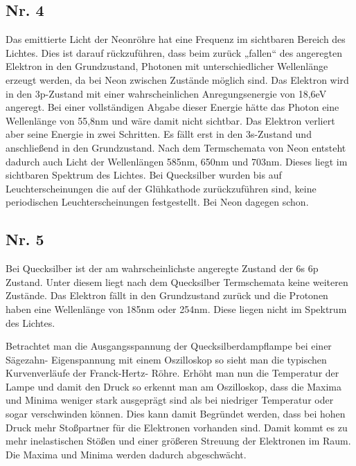 \subsection{Nr. 4}
Das emittierte Licht der Neonröhre hat eine Frequenz im sichtbaren Bereich des Lichtes. Dies ist
darauf rückzuführen, dass beim zurück „fallen“ des angeregten Elektron in den Grundzustand,
Photonen mit unterschiedlicher Wellenlänge erzeugt werden, da bei Neon zwischen Zustände
möglich sind. Das Elektron wird in den 3p-Zustand mit einer wahrscheinlichen Anregungsenergie von
18,6eV angeregt. Bei einer vollständigen Abgabe dieser Energie hätte das Photon eine Wellenlänge
von 55,8nm und wäre damit nicht sichtbar. Das Elektron verliert aber seine Energie in zwei Schritten.
Es fällt erst in den 3s-Zustand und anschließend in den Grundzustand. Nach dem Termschemata von
Neon entsteht dadurch auch Licht der Wellenlängen 585nm, 650nm und 703nm. Dieses liegt im
sichtbaren Spektrum des Lichtes. Bei Quecksilber wurden bis auf Leuchterscheinungen die auf der
Glühkathode zurückzuführen sind, keine periodischen Leuchterscheinungen festgestellt. Bei Neon
dagegen schon.

\subsection{Nr. 5}
Bei Quecksilber ist der am wahrscheinlichste angeregte Zustand der 6s 6p Zustand. Unter diesem
liegt nach dem Quecksilber Termschemata keine weiteren Zustände. Das Elektron fällt in den
Grundzustand zurück und die Protonen haben eine Wellenlänge von 185nm oder 254nm. Diese
liegen nicht im Spektrum des Lichtes.

Betrachtet man die Ausgangsspannung der Quecksilberdampflampe bei einer Sägezahn-
Eigenspannung mit einem Oszilloskop so sieht man die typischen Kurvenverläufe der Franck-Hertz-
Röhre. Erhöht man nun die Temperatur der Lampe und damit den Druck so erkennt man am
Oszilloskop, dass die Maxima und Minima weniger stark ausgeprägt sind als bei niedriger Temperatur
oder sogar verschwinden können. Dies kann damit Begründet werden, dass bei hohen Druck mehr
Stoßpartner für die Elektronen vorhanden sind. Damit kommt es zu mehr inelastischen Stößen und
einer größeren Streuung der Elektronen im Raum. Die Maxima und Minima werden dadurch
abgeschwächt.